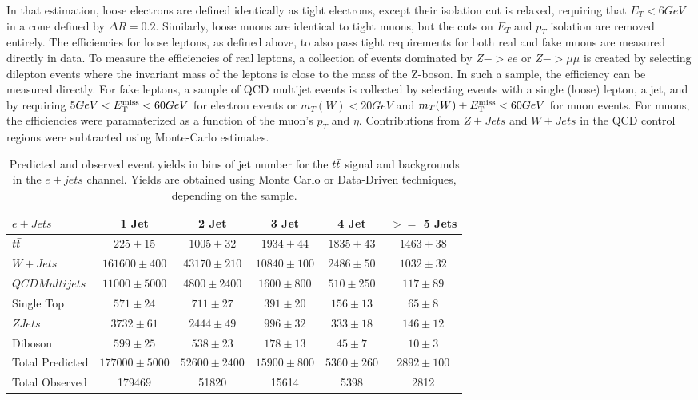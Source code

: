 In that estimation, loose electrons are defined identically as tight electrons, except their isolation cut is relaxed, requiring that $E_{T} < 6 GeV$ in a cone defined by $\Delta R = 0.2$.
Similarly, loose muons are identical to tight muons, but the cuts on $E_{T}$ and $p_{T}$ isolation are removed entirely.
The efficiencies for loose leptons, as defined above, to also pass tight requirements for both real and fake muons are measured directly in data.
To measure the efficiencies of real leptons, a collection of events dominated by $Z->ee$ or $Z->\mu\mu$ is created by selecting dilepton events where the invariant mass of the leptons is close to the mass of the Z-boson.
In such a sample, the efficiency can be measured directly.
For fake leptons, a sample of QCD multijet events is collected by selecting events with a single (loose) lepton, a jet, and by requiring $5 GeV < E_{\mathrm{T}}^{\mathrm{miss}} <  60 GeV$ for electron events or $m_{T}(W) < 20 GeV$ and $m_{T}(W) + E_{\mathrm{T}}^{\mathrm{miss}} < 60 GeV$ for muon events.
For muons, the efficiencies were paramaterized as a function of the muon's $p_{T}$ and $\eta$.
Contributions from $Z+Jets$ and $W+Jets$ in the QCD control regions were subtracted using Monte-Carlo estimates.

\begin{table}
  \tiny
  \begin{tabular}{lccccc}
    \hline
    $e + Jets$ & 1 Jet & 2 Jet & 3 Jet & 4 Jet & $>=$ 5 Jets \\ 
    \hline
    $t\bar{t}$ & $225 \pm 15$ & $1005 \pm 32$ & $1934 \pm 44$ & $1835 \pm 43$ & $1463 \pm 38$ \\
    $W+Jets$ & $161600 \pm 400$ & $43170 \pm 210$ & $10840 \pm 100$ & $2486 \pm 50$ & $1032 \pm 32$ \\
    $QCD Multijets$ & $11000 \pm 5000$ & $4800 \pm 2400$ & $1600 \pm 800$ & $510 \pm 250$ & $117 \pm 89$ \\
    Single Top & $571 \pm 24$ & $711 \pm 27$ & $391 \pm 20$ & $156 \pm 13$ & $65 \pm 8$ \\
    $ZJets$ & $3732 \pm 61$ & $2444 \pm 49$ & $996 \pm 32$ & $333 \pm 18$ & $146 \pm 12$ \\
    Diboson & $599 \pm 25$ & $538 \pm 23$ & $178 \pm 13$ & $45 \pm 7$ & $10 \pm 3$ \\
    \hline
    Total Predicted & $177000 \pm 5000$ & $52600 \pm 2400$ & $15900 \pm 800$ & $5360 \pm 260$ & $2892 \pm 100$ \\
    Total Observed & 179469 & 51820 & 15614 & 5398 & 2812 \\
    \hline
  \end{tabular}
  \caption{Predicted and observed event yields in bins of jet number for the $t\bar{t}$ signal and backgrounds in the $e+jets$ channel.  Yields are obtained using Monte Carlo or Data-Driven techniques, depending on the sample.}
\end{table}


